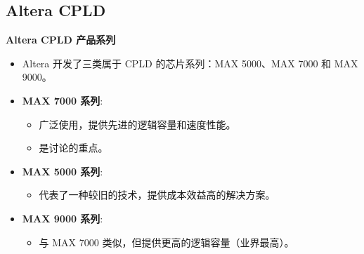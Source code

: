 \subsection{Altera CPLD}
\begin{frame}[allowframebreaks]{\textbf{Altera CPLD 产品系列}}
    \begin{itemize}
    \tightlist
    \item
    Altera 开发了三类属于 CPLD 的芯片系列：MAX 5000、MAX 7000 和 MAX
    9000。
    \item
    \textbf{MAX 7000 系列}:

    \begin{itemize}
    \tightlist
    \item
        广泛使用，提供先进的逻辑容量和速度性能。
    \item
        是讨论的重点。
    \end{itemize}
    \item
    \textbf{MAX 5000 系列}:

    \begin{itemize}
    \tightlist
    \item
        代表了一种较旧的技术，提供成本效益高的解决方案。
    \end{itemize}
    \item
    \textbf{MAX 9000 系列}:

    \begin{itemize}
    \tightlist
    \item
        与 MAX 7000 类似，但提供更高的逻辑容量（业界最高）。
    \end{itemize}
    \end{itemize}
\end{frame}

